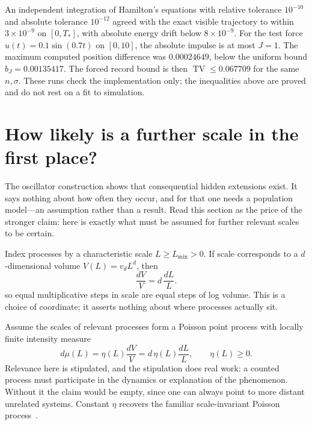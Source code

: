 \documentclass[10pt]{article}
\newcounter{claim}
\newcommand{\TV}{\operatorname{TV}}
\begin{document}
An independent integration of Hamilton's equations with relative tolerance
$10^{-10}$ and absolute tolerance $10^{-12}$ agreed with the exact visible
trajectory to within $3\times10^{-9}$ on $[0,T_*]$, with absolute energy drift
below $8\times10^{-9}$. For the test force $u(t)=0.1\sin(0.7t)$ on $[0,10]$,
the absolute impulse is at most $J=1$. The maximum computed position difference
was $0.00024649$, below the uniform bound $b_J=0.00135417$.
The forced record bound is then $\TV\leq0.067709$ for the same $n,\sigma$.
These runs check the implementation only; the inequalities above are proved
and do not rest on a fit to simulation.

\section*{How likely is a further scale in the first place?}
The oscillator construction shows that consequential hidden extensions exist. It
says nothing about how often they occur, and for that one needs a population
model---an assumption rather than a result. Read this section as the price of the
stronger claim: here is exactly what must be assumed for further relevant scales
to be certain.

Index processes by a characteristic scale $L\geq L_{\min}>0$. If scale
corresponds to a $d$-dimensional volume $V(L)=v_dL^d$, then
\[
\frac{dV}{V}=d\,\frac{dL}{L}.
\]
so equal multiplicative steps in scale are equal steps of log volume. This is a
choice of coordinate; it asserts nothing about where processes actually sit.

Assume the scales of relevant processes form a Poisson point process with
locally finite intensity measure
\begin{equation}
d\mu(L)=\eta(L)\frac{dV}{V}
=d\,\eta(L)\frac{dL}{L},\qquad \eta(L)\geq0.
\label{eq:intensity}
\end{equation}
Relevance here is stipulated, and the stipulation does real work: a counted
process must participate in the dynamics or explanation of the phenomenon.
Without it the claim would be empty, since one can always point to more distant
unrelated systems. Constant $\eta$ recovers the familiar scale-invariant Poisson
process~\cite{arratia}.
\end{document}
